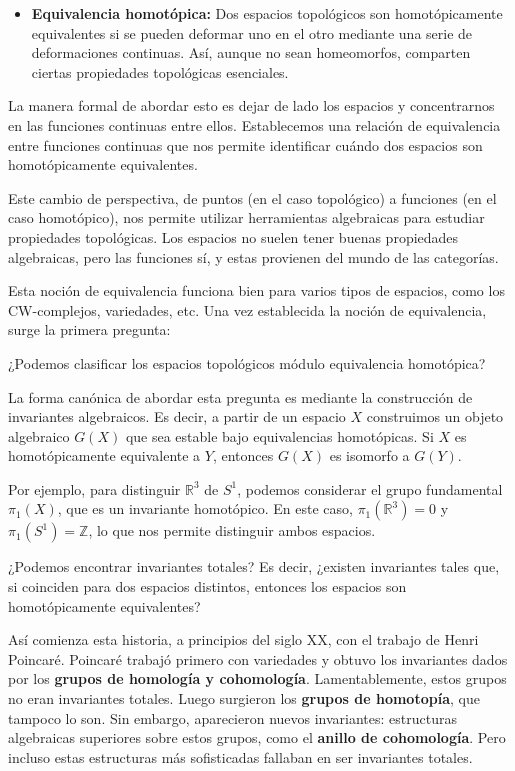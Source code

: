 \begin{itemize}
    \item \textbf{Equivalencia homotópica:} Dos espacios topológicos son homotópicamente equivalentes si se pueden deformar uno en el otro mediante una serie de deformaciones continuas. Así, aunque no sean homeomorfos, comparten ciertas propiedades topológicas esenciales.
\end{itemize}

La manera formal de abordar esto es dejar de lado los espacios y concentrarnos en las funciones continuas entre ellos. Establecemos una relación de equivalencia entre funciones continuas que nos permite identificar cuándo dos espacios son homotópicamente equivalentes.

Este cambio de perspectiva, de puntos (en el caso topológico) a funciones (en el caso homotópico), nos permite utilizar herramientas algebraicas para estudiar propiedades topológicas. Los espacios no suelen tener buenas propiedades algebraicas, pero las funciones sí, y estas provienen del mundo de las categorías.

Esta noción de equivalencia funciona bien para varios tipos de espacios, como los CW-complejos, variedades, etc. Una vez establecida la noción de equivalencia, surge la primera pregunta:

\begin{pregunta}
    ¿Podemos clasificar los espacios topológicos módulo equivalencia homotópica?
\end{pregunta}

La forma canónica de abordar esta pregunta es mediante la construcción de invariantes algebraicos. Es decir, a partir de un espacio $X$ construimos un objeto algebraico $G(X)$ que sea estable bajo equivalencias homotópicas. Si $X$ es homotópicamente equivalente a $Y$, entonces $G(X)$ es isomorfo a $G(Y)$.

Por ejemplo, para distinguir $\mathbb{R}^3$ de $S^1$, podemos considerar el grupo fundamental $\pi_1(X)$, que es un invariante homotópico. En este caso, $\pi_1(\mathbb{R}^3) = 0$ y $\pi_1(S^1) = \mathbb{Z}$, lo que nos permite distinguir ambos espacios.

\begin{pregunta}
    ¿Podemos encontrar invariantes totales? Es decir, ¿existen invariantes tales que, si coinciden para dos espacios distintos, entonces los espacios son homotópicamente equivalentes?
\end{pregunta}

Así comienza esta historia, a principios del siglo XX, con el trabajo de Henri Poincaré. Poincaré trabajó primero con variedades y obtuvo los invariantes dados por los \textbf{grupos de homología y cohomología}. Lamentablemente, estos grupos no eran invariantes totales. Luego surgieron los \textbf{grupos de homotopía}, que tampoco lo son. Sin embargo, aparecieron nuevos invariantes: estructuras algebraicas superiores sobre estos grupos, como el \textbf{anillo de cohomología}. Pero incluso estas estructuras más sofisticadas fallaban en ser invariantes totales.


